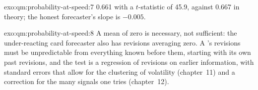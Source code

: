 \begin{solution}{exo:qm:probability-at-speed:7}
0.661 with a $t$-statistic of 45.9, against 0.667 in theory; the honest forecaster's slope is
$-0.005$.
\end{solution}

\begin{solution}{exo:qm:probability-at-speed:8}
A mean of zero is necessary, not sufficient: the under-reacting card forecaster also has
revisions averaging zero. A 's revisions must be unpredictable from everything
known before them, starting with its own past revisions, and the test is a regression of
revisions on earlier information, with standard errors that allow for the clustering of
volatility (chapter~11) and a correction for the many signals one tries (chapter~12).
\end{solution}

